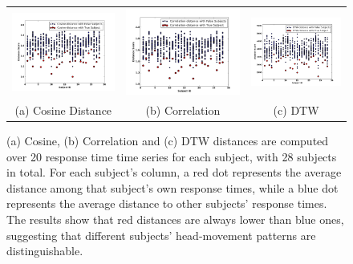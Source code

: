 \begin{figure}[t]
\begin{center}
\begin{tabular}{ccc}
\includegraphics [width=.31\linewidth]{figure/resp_time_cos.png}&
\includegraphics [width=.31\linewidth]{figure/resp_time_cor.png}&
\includegraphics [width=.31\linewidth]{figure/resp_time_dtw.png}\\
(a) Cosine Distance & (b) Correlation & (c) DTW \\
\end{tabular}
\end{center}
\caption{\label{fig:distance} (a) Cosine, (b) Correlation and (c) DTW distances are computed over 20 response time time series for each subject, with 28 subjects in total. For each subject's column, a red dot represents the average distance among that subject's own response times, while a blue dot represents the average distance to other subjects' response times. The results show that red distances are always lower than blue ones, suggesting that different subjects' head-movement patterns are distinguishable.}
\vspace{-2pt}
\end{figure}



